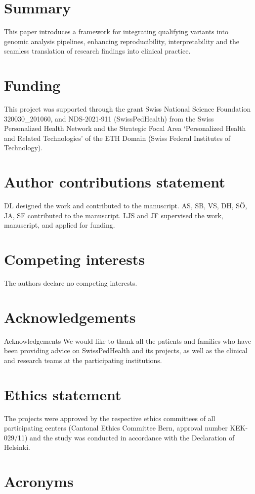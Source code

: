 \documentclass[unnumsec,webpdf,contemporary,large,namedate]{oup-authoring-template}
\begin{document}
\section{Summary}
This paper introduces a framework for integrating qualifying variants into genomic analysis pipelines, enhancing reproducibility, interpretability and the seamless translation of research findings into clinical practice.

\section{Funding}
This project was supported through the grant Swiss National Science Foundation  320030\_201060, and NDS-2021-911 (SwissPedHealth) from the Swiss Personalized Health Network and the Strategic Focal Area `Personalized Health and Related Technologies' of the ETH Domain (Swiss Federal Institutes of Technology).

\section{Author contributions statement}
DL designed the work and contributed to the manuscript.
AS, SB, VS, DH, SÖ, JA, SF contributed to the manuscript.
LJS and JF supervised the work, manuscript, and applied for funding.

\section{Competing interests}
The authors declare no competing interests.

\section{Acknowledgements}
Acknowledgements We would like to thank all the patients and families who have been providing advice on SwissPedHealth and its projects, as well as the clinical and research teams at the participating institutions.

\section{Ethics statement}
The projects were approved by the respective ethics committees of all participating centers (Cantonal Ethics Committee Bern, approval number KEK-029/11) and the study was conducted in accordance with the Declaration of Helsinki.

\section{Acronyms}
\end{document}
